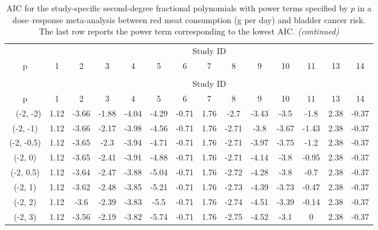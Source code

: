 \documentclass[11pt,a4paper,twoside,openany]{book}\usepackage{knitr}
\begin{document}
{{\begin{knitrout}\footnotesize
{}\color{fgcolor}
\begin{landscape}
\begin{longtable}[t]{cccccccccccccc}
\caption{\label{tab:AIC_pi_red}AIC for the study-specific second-degree fractional polynomials with power terms specified by $p$ in a dose--response meta-analysis between red meat consumption (g per day) and bladder cancer risk. The last row reports the power term corresponding to the lowest AIC.}\\
\toprule
\multicolumn{ 1}{c}{ } & \multicolumn{13}{c}{Study ID} \\
\cmidrule(l{2pt}r{2pt}){2-14}
p & 1 & 2 & 3 & 4 & 5 & 6 & 7 & 8 & 9 & 10 & 11 & 13 & 14\\
\midrule
\endfirsthead
\caption[]{AIC for the study-specific second-degree fractional polynomials with power terms specified by $p$ in a dose--response meta-analysis between red meat consumption (g per day) and bladder cancer risk. The last row reports the power term corresponding to the lowest AIC. \textit{(continued)}}\\
\toprule
\multicolumn{ 1}{c}{ } & \multicolumn{13}{c}{Study ID} \\
\cmidrule(l{2pt}r{2pt}){2-14}
p & 1 & 2 & 3 & 4 & 5 & 6 & 7 & 8 & 9 & 10 & 11 & 13 & 14\\
\midrule
\endhead
\
\endfoot
\bottomrule
\endlastfoot
(-2, -2) & 1.12 & -3.66 & -1.88 & -4.04 & -4.29 & -0.71 & 1.76 & -2.7 & -3.43 & -3.5 & -1.8 & 2.38 & -0.37\\
(-2, -1) & 1.12 & -3.66 & -2.17 & -3.98 & -4.56 & -0.71 & 1.76 & -2.71 & -3.8 & -3.67 & -1.43 & 2.38 & -0.37\\
(-2, -0.5) & 1.12 & -3.65 & -2.3 & -3.94 & -4.71 & -0.71 & 1.76 & -2.71 & -3.97 & -3.75 & -1.2 & 2.38 & -0.37\\
(-2, 0) & 1.12 & -3.65 & -2.41 & -3.91 & -4.88 & -0.71 & 1.76 & -2.71 & -4.14 & -3.8 & -0.95 & 2.38 & -0.37\\
(-2, 0.5) & 1.12 & -3.64 & -2.47 & -3.88 & -5.04 & -0.71 & 1.76 & -2.72 & -4.28 & -3.8 & -0.7 & 2.38 & -0.37\\
\addlinespace
(-2, 1) & 1.12 & -3.62 & -2.48 & -3.85 & -5.21 & -0.71 & 1.76 & -2.73 & -4.39 & -3.73 & -0.47 & 2.38 & -0.37\\
(-2, 2) & 1.12 & -3.6 & -2.39 & -3.83 & -5.5 & -0.71 & 1.76 & -2.74 & -4.51 & -3.39 & -0.14 & 2.38 & -0.37\\
(-2, 3) & 1.12 & -3.56 & -2.19 & -3.82 & -5.74 & -0.71 & 1.76 & -2.75 & -4.52 & -3.1 & 0 & 2.38 & -0.37\\

\end{longtable}
\end{landscape}
\end{knitrout}}}
\end{document}

